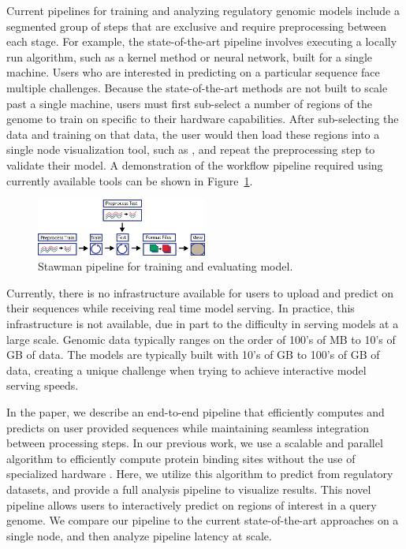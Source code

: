 \documentclass{sig-alternate-05-2015}
\begin{document}
Current pipelines for training and analyzing regulatory genomic models include a segmented group of steps that are exclusive and require preprocessing between each stage. For example, the state-of-the-art pipeline involves executing a locally run algorithm, such as a kernel method or neural network, built for a single machine. Users who are interested in predicting on a particular sequence face multiple challenges. Because the state-of-the-art methods are not built to scale past a single machine, users must first sub-select a number of regions of the genome to train on specific to their hardware capabilities. After sub-selecting the data and training on that data, the user would then load these regions into a single node visualization tool, such as \cite{igv2011}, and repeat the preprocessing step to validate their model. A demonstration of the workflow pipeline required using currently available tools can be shown in Figure~\ref{fig:strawmanPipeline}.

\begin{figure}[b]
  \label{fig:strawmanPipeline}
  \includegraphics[width=0.5\textwidth]{figures/strawman.png}
  \caption{Stawman pipeline for training and evaluating model.}
\end{figure}

Currently, there is no infrastructure available for users to upload and predict on their sequences while receiving real time model serving. In practice, this infrastructure is not available, due in part to the difficulty in serving models at a large scale. Genomic data typically ranges on the order of 100's of MB to 10's of GB of data. The models are typically built with 10's of GB to 100's of GB of data, creating a unique challenge when trying to achieve interactive model serving speeds.

In the paper, we describe an end-to-end pipeline that efficiently computes and predicts on user provided sequences while maintaining seamless integration between processing steps. In our previous work, we use a scalable and parallel algorithm to efficiently compute protein binding sites without the use of specialized hardware \cite{tfbinding}. Here, we utilize this algorithm to predict from regulatory datasets, and provide a full analysis pipeline to visualize results. This novel pipeline allows users to interactively predict on regions of interest in a query genome. We compare our pipeline to the current state-of-the-art approaches on a single node, and then analyze pipeline latency at scale. \\
\end{document}
